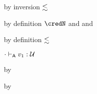 {\begin{lamportproof*}
    \begin{pfproof}
        \begin{pfproof}
          by inversion $\lesssim$
        \end{pfproof}
        \begin{pfproof}
          by definition $\credN$ and  and \pfih
        \end{pfproof}
      \qedstep
        \begin{pfproof}
          by definition $\lesssim$
        \end{pfproof}
    \end{pfproof}

    \begin{pfproof}
      \absurdstep
        \begin{pfproof}
          ${\cdot} \vdash_{\mathsf{A}} v_1 : {\mathcal U}$
        \end{pfproof}
    \end{pfproof}

    \begin{pfproof}
      \absurdstep
        \begin{pfproof}
          by 
        \end{pfproof}
    \end{pfproof}

    \begin{pfproof}
      \absurdstep
        \begin{pfproof}
          by 
        \end{pfproof}
    \end{pfproof}


\end{lamportproof*}}
